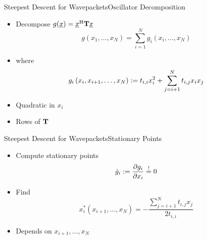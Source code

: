 \documentclass{beamer}
\begin{document}
\begin{frame}{Steepest Descent for Wavepackets}{Oscillator Decomposition}
  \begin{itemize}
    \item Decompose $g(\underline{x}) = \underline{x}{}^{\textnormal{H}}\mathbf{T}\underline{x}$
    \begin{equation*}
      g\left(x_1, \ldots, x_N\right) = \sum_{i=1}^N g_i(x_i, \ldots, x_N)
    \end{equation*}
    \item where
    \begin{equation*}
      g_i\left(x_i, x_{i+1}, \ldots, x_N\right)
      := t_{i,i} x_i^2 + \sum_{j=i+1}^{N} t_{i,j} x_i x_j
    \end{equation*}
    \item Quadratic in $x_{i}$
    \item Rows of $\mathbf{T}$
  \end{itemize}
\end{frame}


\begin{frame}{Steepest Descent for Wavepackets}{Stationary Points}
  \begin{itemize}
    \item Compute stationary points
    \begin{equation*}
      \dot{g}_i := \frac{\partial g_i}{\partial x_i} \stackrel{!}{=} 0
    \end{equation*}
    \item Find
    \begin{equation*}
      x_i^{*}\left(x_{i+1}, \ldots, x_N\right)
      = - \frac{ \sum_{j=i+1}^{N} t_{i,j} x_j }{ 2 t_{i,i} }
    \end{equation*}
    \item Depends on $x_{i+1}, \ldots, x_N$
  \end{itemize}
\end{frame}
\end{document}
